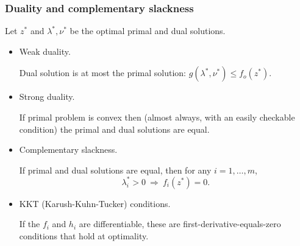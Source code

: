 \documentclass[smaller,handout]{beamer}
\def\darkred{\color{red!70!black}}
\def\darkgreen{\color{green!60!black}}
\begin{document}
\begin{frame}
\frametitle{Duality and complementary slackness}

{\darkgreen Let $z^*$ and $\lambda^*, \nu^*$ be the optimal primal and dual solutions.}

\begin{itemize}
\item<2-> {\darkred Weak duality.}

Dual solution is at most the primal solution: $g(\lambda^*, \nu^*) \leq f_o(z^*)$.

\item<3-> {\darkred Strong duality.}

If primal problem is convex then (almost always, with an easily checkable condition) the primal and dual solutions are equal.

\item<4-> {\darkred Complementary slackness.}

If primal and dual solutions are equal, then for any $i = 1, \ldots, m$,
$$ \lambda_i^* > 0 \ \Rightarrow \ f_i(z^*) = 0 .$$

\item<5-> {\darkred KKT (Karush-Kuhn-Tucker) conditions.}

If the $f_i$ and $h_i$ are differentiable, these are first-derivative-equals-zero conditions that hold at optimality.


\end{itemize}

\end{frame}
\end{document}

